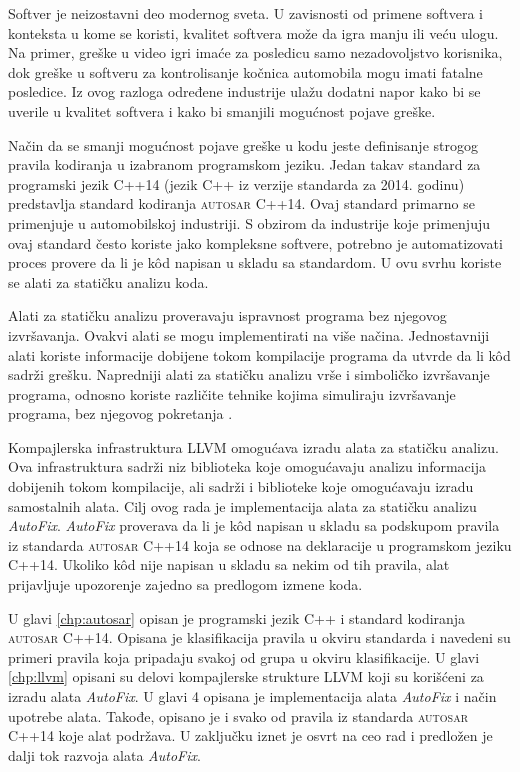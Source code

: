 \documentclass[12pt,oneside]{memoir}
\begin{document}
Softver je neizostavni deo modernog sveta. U zavisnosti od primene softvera i konteksta u kome se koristi, kvalitet softvera mo\v{z}e da igra
manju ili ve\'{c}u ulogu. Na primer, gre\v{s}ke u video igri ima\'{c}e za posledicu samo nezadovoljstvo korisnika, dok gre\v{s}ke u softveru
za kontrolisanje ko\v{c}nica automobila mogu imati fatalne posledice. Iz ovog razloga određene industrije ula\v{z}u dodatni napor kako bi se uverile u kvalitet softvera
i kako bi smanjili mogu\'{c}nost pojave gre\v{s}ke. \par
Na\v{c}in da se smanji mogu\'{c}nost pojave gre\v{s}ke u kodu jeste definisanje strogog pravila kodiranja u izabranom programskom jeziku. Jedan takav standard za programski jezik C++14 (jezik C++ iz verzije standarda za 2014. godinu) predstavlja standard kodiranja \textsc{autosar} C++14. Ovaj standard primarno se primenjuje u automobilskoj industriji. S obzirom da industrije koje primenjuju ovaj standard \v{c}esto koriste jako kompleksne softvere, potrebno je automatizovati proces provere da li je k\^{o}d napisan u skladu sa standardom. U ovu svrhu koriste se alati za stati\v{c}ku analizu koda. \par Alati za stati\v{c}ku analizu proveravaju ispravnost programa bez njegovog izvr\v{s}avanja. Ovakvi alati se mogu implementirati na vi\v{s}e na\v{c}ina. Jednostavniji alati koriste informacije dobijene tokom kompilacije programa da utvrde da li k\^{o}d sadr\v{z}i gre\v{s}ku. Napredniji alati za stati\v{c}ku analizu vr\v{s}e i simboli\v{c}ko izvr\v{s}avanje programa, odnosno koriste razli\v{c}ite tehnike kojima simuliraju izvr\v{s}avanje programa, bez njegovog pokretanja \cite{Etran, AutoCheck}. \par
Kompajlerska infrastruktura LLVM omogu\'{c}ava izradu alata za stati\v{c}ku analizu. Ova infrastruktura sadr\v{z}i niz biblioteka koje omogu\'{c}avaju analizu informacija dobijenih tokom kompilacije, ali sadr\v{z}i i biblioteke koje omogu\'{c}avaju izradu samostalnih alata. Cilj ovog rada je implementacija alata za stati\v{c}ku analizu
\textit{AutoFix}. \textit{AutoFix} proverava da li je k\^{o}d napisan u skladu sa podskupom pravila iz standarda \textsc{autosar} C++14 koja se odnose na deklaracije u programskom jeziku C++14. Ukoliko k\^{o}d nije napisan u skladu sa nekim od tih pravila, alat prijavljuje upozorenje zajedno sa predlogom izmene koda. 

U glavi \ref{chp:autosar} opisan je programski jezik C++ i standard kodiranja \textsc{autosar} C++14. Opisana je klasifikacija pravila u okviru standarda i navedeni su primeri pravila koja pripadaju svakoj od grupa u okviru klasifikacije. U glavi \ref{chp:llvm} opisani su delovi kompajlerske strukture LLVM koji su kori\v{s}\'{c}eni za izradu alata \textit{AutoFix}. U glavi 4 opisana je implementacija alata \textit{AutoFix} i na\v{c}in upotrebe alata. Takođe, opisano je i svako od pravila iz standarda \textsc{autosar} C++14 koje alat podr\v{z}ava. U zaklju\v{c}ku iznet je osvrt na ceo rad i predlo\v{z}en je dalji tok razvoja alata \textit{AutoFix}.
\end{document}
